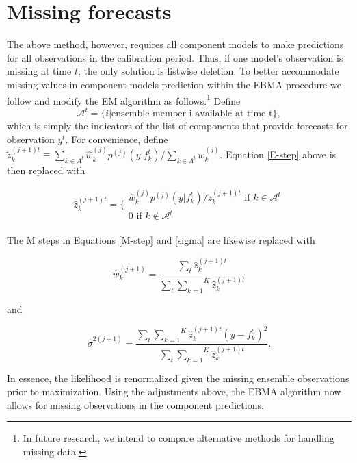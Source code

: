 \documentclass[12pt,fullpage,endnotes]{article}
\begin{document}
\section{Missing forecasts}
\label{missing}
The above method, however, requires all component models to make
predictions for all observations in the calibration period. Thus, if
one model's observation is missing at time $t$, the only solution is
listwise deletion. To better accommodate missing values in component
models prediction within the EBMA procedure we follow
\citet{Fraley:2010} and modify the EM algorithm as
follows.\footnote{In future research, we intend to compare alternative
  methods for handling missing data. %
}
Define $$\mathcal{A}^t = \{i|\mbox{ensemble member i available at time
  t}\},$$\noindent which is simply the indicators of the list of
components that provide forecasts for observation $y^t$.  For
convenience, define $\tilde{z}_k^{(j+1)t} \equiv {{\underset{k \in
      A^t}{\sum}}\hat{w}^{(j)}_kp^{(j)}(y|f_{k}^{t})}/{\underset{k \in
    A^t}\sum w_k^{(j)}}$.  Equation \ref{E-step} above is then
replaced with

\begin{equation}
\hat{z}^{(j+1)t}_{k} = \Bigg\{ \begin{array}{c} {\hat{w}^{(j)}_k p^{(j)}(y|f_{k}^{t})}/{\tilde{z}_k^{(j+1)t} } \mbox{ if } k \in \mathcal{A}^t\\ 0 \mbox{ if } k \notin \mathcal{A}^t \end{array}
\end{equation}



\noindent  The M steps in Equations \ref{M-step} and \ref{sigma} are likewise replaced with

\begin{equation}
\hat{w}^{(j+1)}_k=\frac{\underset{t}{\sum}\hat{z}^{(j+1)t}_{k}}{\underset{t}{\sum}\overset{K}{\underset{k=1}{ \sum}} \hat{z}_k^{(j+1)t}}
\end{equation}


\noindent and

\begin{equation}
\hat{\sigma}^{2(j+1)}=\frac{\underset{t}{\sum}\overset{K}{\underset{k=1}{\sum}}\hat{z}^{(j+1)t}_{k}(y-f_{k}^{t})^2 }{\underset{t}{\sum}\overset{K}{\underset{k=1}{ \sum}} \hat{z}_k^{(j+1)t}}.
\end{equation}

\noindent In essence, the likelihood is renormalized given the missing
ensemble observations prior to maximization. Using the adjustments
above, the EBMA algorithm now allows for missing observations in the
component predictions.
\end{document}
